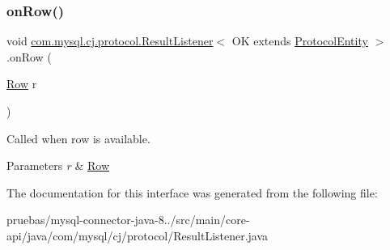 \subsubsection{\texorpdfstring{on\+Row()}{onRow()}}
{\footnotesize\ttfamily void \mbox{\hyperlink{interfacecom_1_1mysql_1_1cj_1_1protocol_1_1_result_listener}{com.\+mysql.\+cj.\+protocol.\+Result\+Listener}}$<$ OK extends \mbox{\hyperlink{interfacecom_1_1mysql_1_1cj_1_1protocol_1_1_protocol_entity}{Protocol\+Entity}} $>$.on\+Row (\begin{DoxyParamCaption}\item[{\mbox{\hyperlink{interfacecom_1_1mysql_1_1cj_1_1result_1_1_row}{Row}}}]{r }\end{DoxyParamCaption})}

Called when row is available.


\begin{DoxyParams}{Parameters}
{\em r} & \mbox{\hyperlink{}{Row}} \\
\hline
\end{DoxyParams}


The documentation for this interface was generated from the following file\+:\begin{DoxyCompactItemize}
\item 
pruebas/mysql-\/connector-\/java-\/8../src/main/core-\/api/java/com/mysql/cj/protocol/Result\+Listener.\+java\end{DoxyCompactItemize}
